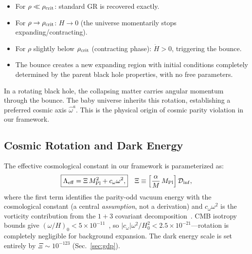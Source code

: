 \documentclass[aps,prd,twocolumn,superscriptaddress,showpacs,preprintnumbers,nofootinbib,longbibliography,floatfix]{revtex4-2}
\newcommand{\Leff}{\Lambda_{\rm eff}}
\newcommand{\Dinf}{\mathcal{D}_{\rm inf}}
\newcommand{\rhocrit}{\rho_{\rm crit}}
\newcommand{\MPl}{M_{\rm Pl}}
\begin{document}
\begin{itemize}[leftmargin=*]
\item For $\rho \ll \rhocrit$: standard GR is recovered exactly.
\item For $\rho \to \rhocrit$: $H \to 0$ (the universe momentarily stops expanding/contracting).
\item For $\rho$ slightly below $\rhocrit$ (contracting phase): $\dot{H} > 0$, triggering the bounce.
\item The bounce creates a new expanding region with initial conditions completely determined by the parent black hole properties, with no free parameters.
\end{itemize}

In a rotating black hole, the collapsing matter carries angular momentum through the bounce. The baby universe inherits this rotation, establishing a preferred cosmic axis $\hat{\omega}^a$. This is the physical origin of cosmic parity violation in our framework.


\subsection{Cosmic Rotation and Dark Energy}\label{sec:rotation}

The effective cosmological constant in our framework is parameterized as:
\begin{align}\label{eq:Leff_full}
\boxed{\Leff = \Xi\,\MPl^2 + c_\omega\omega^2,}\quad
\Xi\equiv \left[\frac{\alpha}{M}\,\MPl\right]\Dinf,
\end{align}
\label{eq:Leff}%
where the first term identifies the parity-odd vacuum energy with the cosmological constant (a central \textit{assumption}, not a derivation) and $c_\omega\omega^2$ is the vorticity contribution from the $1+3$ covariant decomposition~\cite{Ellis1989}. CMB isotropy bounds give $(\omega/H)_0 < 5\times 10^{-11}$~\cite{Saadeh2016}, so $|c_\omega|\omega^2/H_0^2 < 2.5\times 10^{-21}$---rotation is completely negligible for background expansion. The dark energy scale is set entirely by $\Xi \sim 10^{-123}$ (Sec.~\ref{sec:gdp}).
\end{document}
